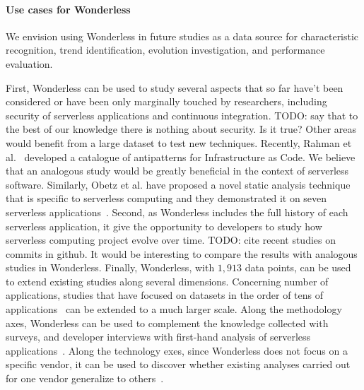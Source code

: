 \paragraph{Use cases for Wonderless}
We envision using Wonderless in future studies as a data source for characteristic recognition, 
trend identification, evolution investigation, and performance evaluation.

First, Wonderless can be used to study several aspects that so far have't
been considered or have been only marginally touched by researchers, 
including security of serverless applications and continuous integration.
TODO: say that to the best of our knowledge there is nothing about security.
Is it true?
%
Other areas would benefit from a large dataset to test new techniques.
Recently, Rahman et al.~\cite{DBLP:journals/ese/RahmanFW20} developed a 
catalogue of antipatterns for Infrastructure as Code. We believe that an analogous 
study would be greatly beneficial in the context of serverless software.
Similarly, Obetz et al. have proposed a novel static analysis technique that is  
specific to serverless computing and they demonstrated it on 
seven serverless applications~\cite{10.5555/3357034.3357059}.
%
Second, as Wonderless includes the full history of each serverless application, 
it give the opportunity to developers to study how serverless computing 
project evolve over time.
TODO: cite recent studies on commits in github. It would be interesting to compare the 
results with analogous studies in Wonderless.
%
Finally, Wonderless, with $1,913$ data points, can be used to extend existing 
studies along several dimensions. Concerning number of applications,
studies that have focused on datasets in the order of tens of 
applications~\cite{eismann2020serverless} can be extended to a much larger scale.
Along the methodology axes, Wonderless can be used to complement the knowledge collected 
with surveys, and developer interviews with first-hand analysis of
serverless applications~\cite{leitner2019mixed}.
Along the technology exes, since Wonderless does not focus on a specific vendor, it can be used
to discover whether existing analyses carried out for one vendor
generalize to others~\cite{spillner2019quantitative}.











